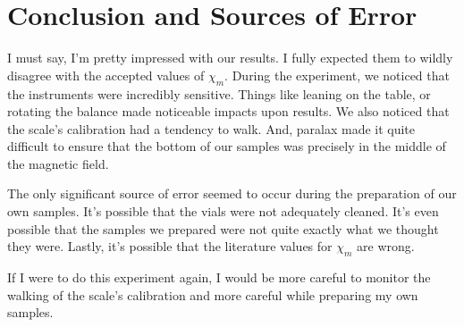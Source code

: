\documentclass{article}
\begin{document}
\section{Conclusion and Sources of Error}

I must say, I'm pretty impressed with our results. I fully expected them to
wildly disagree with the accepted values of $\chi_m$. During the experiment, we
noticed that the instruments were incredibly sensitive. Things like leaning on
the table, or rotating the balance made noticeable impacts upon results. We
also noticed that the scale's calibration had a tendency to walk. And, paralax
made it quite difficult to ensure that the bottom of our samples was precisely
in the middle of the magnetic field. 

The only significant source of error seemed to occur during the preparation of
our own samples. It's possible that the vials were not adequately cleaned. It's
even possible that the samples we prepared were not quite exactly what we
thought they were. Lastly, it's possible that the literature values for
$\chi_m$ are wrong.

If I were to do this experiment again, I would be more careful to monitor the
walking of the scale's calibration and more careful while preparing my own
samples.
\end{document}
